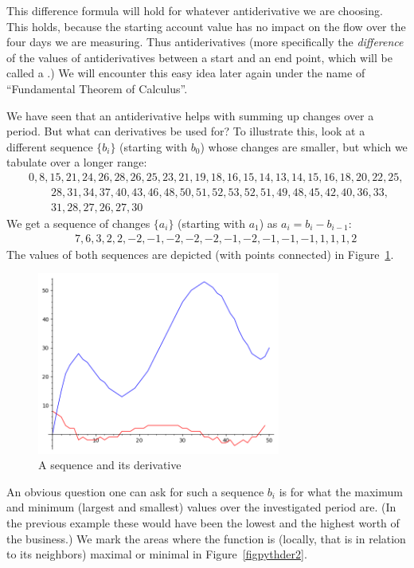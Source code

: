 This difference formula will hold for whatever antiderivative we are
choosing. This holds, because the starting account value has no impact on
the flow over the four days we are measuring. Thus antiderivatives (more
specifically the {\em difference} of the values of antiderivatives between a
start and an end point, which will be called a .)
We will encounter this easy idea later again under the name of
``Fundamental Theorem of Calculus''.
\medskip

We have seen that an antiderivative helps with summing up changes over a
period. But what can derivatives be used for? To illustrate this, look at
a different sequence $\{b_i\}$ (starting with $b_0$) whose changes are smaller, but which we tabulate
over a longer range:
\begin{eqnarray*}
&&
 0, 8, 15, 21, 24, 26, 28, 26, 25, 23, 21, 19, 18, 16, 15, 14, 13, 14, 15,
  16, 18, 20, 22, 25,\\
 &&\qquad 28, 31, 34, 37, 40, 43, 46, 48, 50, 51, 52, 53, 52, 51,
  49, 48, 45, 42, 40, 36, 33,\\
  &&\qquad 31, 28, 27, 26, 27, 30 
\end{eqnarray*}
We get a sequence of changes $\{a_i\}$ (starting with $a_1$) as
$a_i=b_i-b_{i-1}$:
\begin{eqnarray*}
&&
7, 6, 3, 2, 2, -2, -1, -2, -2, -2, -1, -2, -1, -1, -1, 1, 1, 1, 2
\end{eqnarray*}
The values of both sequences are depicted (with points connected) in
Figure~\ref{figpythder}.

\begin{figure}
\begin{center}
\includegraphics[width=8cm]{pic/pythder.png}
\end{center}
\caption{A sequence and its derivative}
\label{figpythder}
\end{figure}

An obvious question one can ask for such a sequence $b_i$ is for what the
maximum and minimum (largest and smallest) values over the investigated
period are.
(In the previous example these would have been the lowest and the highest
worth of the business.) We mark the areas where the function is (locally,
that is in relation to its neighbors) maximal or minimal in
Figure~\ref{figpythder2}.

